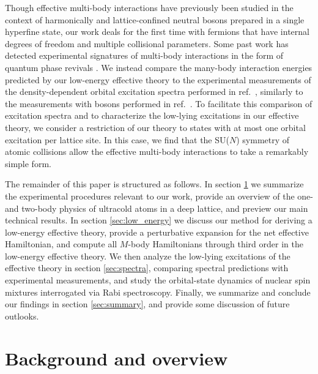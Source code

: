 \documentclass[preprint,showkeys,nofootinbib]{revtex4-1}
\newcommand{\1}{\mathds{1}}
\begin{document}
Though effective multi-body interactions have previously been studied
in the context of harmonically \cite{johnson2012effective,
  yin2014universal} and lattice-confined \cite{johnson2009effective}
neutral bosons prepared in a single hyperfine state, our work deals
for the first time with fermions that have internal degrees of freedom
and multiple collisional parameters.  Some past work has detected
experimental signatures of multi-body interactions in the form of
quantum phase revivals \cite{will2010timeresolved}.  We instead
compare the many-body interaction energies predicted by our low-energy
effective theory to the experimental measurements of the
density-dependent orbital excitation spectra performed in
ref.~\cite{goban2018emergence}, similarly to the measurements with
bosons performed in ref.~\cite{mark2011precision}.  To facilitate this
comparison of excitation spectra and to characterize the low-lying
excitations in our effective theory, we consider a restriction of our
theory to states with at most one orbital excitation per lattice site.
In this case, we find that the SU($N$) symmetry of atomic collisions
allow the effective multi-body interactions to take a remarkably
simple form.

The remainder of this paper is structured as follows.  In section
\ref{sec:overview} we summarize the experimental procedures relevant
to our work, provide an overview of the one- and two-body physics of
ultracold atoms in a deep lattice, and preview our main technical
results.  In section \ref{sec:low_energy} we discuss our method for
deriving a low-energy effective theory, provide a perturbative
expansion for the net effective Hamiltonian, and compute all $M$-body
Hamiltonians through third order in the low-energy effective theory.
We then analyze the low-lying excitations of the effective theory in
section \ref{sec:spectra}, comparing spectral predictions with
experimental measurements, and study the orbital-state dynamics of
nuclear spin mixtures interrogated via Rabi spectroscopy.  Finally, we
summarize and conclude our findings in section \ref{sec:summary}, and
provide some discussion of future outlooks.


\section{Background and overview}
\label{sec:overview}
\end{document}
